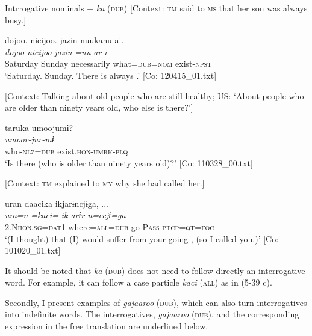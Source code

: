 \ea \label{ex:5:39}   Intrrogative nominals + \textit{ka} (\textsc{dub})
 \ea \label{ex:5:39a} [Context: \textsc{tm} said to \textsc{ms} that her son was always busy.]

\glll  {\textbar}dojoo{\textbar}.  {\textbar}nicijoo{\textbar}.  jazin  nuukanu  ai.\\
\textit{dojoo}  \textit{nicijoo}  \textit{jazin}  \textit{=nu}  \textit{ar-i}\\
Saturday  Sunday  necessarily  what=\textsc{dub}=\textsc{nom}  exist-\textsc{npst}\\
\glt ‘Saturday. Sunday. There is always .’ [Co: 120415\_01.txt]

 \ex \label{ex:5:39b} [Context: Talking about old people who are still healthy; US: ‘About people who are older than ninety years old, who else is there?’]

\glll  taruka  umoojumɨ?\\
\textit{}  \textit{umoor-jur-mɨ}\\
who-\textsc{nlz}=\textsc{dub}  exist.\textsc{hon}-\textsc{umrk}-\textsc{plq}\\
\glt ‘Is there  (who is older than ninety years old)?’ [Co: 110328\_00.txt]

 \ex \label{ex:5:39c} [Context: \textsc{tm} explained to \textsc{my} why she had called her.]

\glll  uran  daacika  ikjarɨncjɨga, ...\\
\textit{ura=n}  \textit{=kaci=}  \textit{ik-arɨr-n=ccjɨ=ga}\\
2.N\textsc{hon}.\textsc{sg}=\textsc{dat}1  where=\textsc{all}=\textsc{dub}  go-P\textsc{ass}-\textsc{ptcp}=\textsc{qt}=\textsc{foc}\\
\glt ‘(I thought) that (I) would suffer from your going , (so I called you.)’ [Co: 101020\_01.txt]
\z
\z

It should be noted that \textit{ka} (\textsc{dub}) does not need to follow directly an interrogative word. For example, it can follow a case particle \textit{kaci} (\textsc{all}) as in (5-39 c).

  Secondly, I present examples of \textit{gajaaroo} (\textsc{dub}), which can also turn interrogatives into indefinite words. The interrogatives, \textit{gajaaroo} (\textsc{dub}), and the corresponding expression in the free translation are underlined below.

